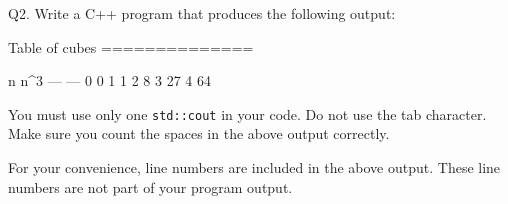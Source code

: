 Q2. Write a C++ program that produces the following output:
\begin{console}[numbers=left]
Table of cubes
==============

n       n^3
---     ---
0       0
1       1
2       8
3       27
4       64

\end{console}
You must use only one 
\verb!std::cout! in your code. 
Do not use the tab character. 
Make sure you count the spaces in the above output correctly.

For your convenience, line numbers are included in the above output.
These line numbers are not part of your program output.

